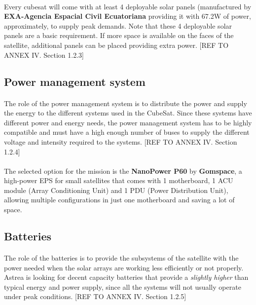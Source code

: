 \paragraph{}Every cubesat will come with at least 4 deployable solar panels (manufactured by \textbf{EXA-Agencia Espacial Civil Ecuatoriana} providing it with 67.2W of power, approximately, to supply peak demands. Note that these 4 deployable solar panels are a basic requirement. If more space is available on the faces of the satellite, additional panels can be placed providing extra power. [{REF TO ANNEX IV. Section 1.2.3}]

\subsection{Power management system}
\paragraph{}The role of the power management system is to distribute the power and supply the energy to the different systems used in the CubeSat. Since these systems have different power and energy needs, the power management system has to be highly compatible and must have a high enough number of buses to supply the different voltage and intensity required to the systems. [{REF TO ANNEX IV. Section 1.2.4}]

\paragraph{}The selected option for the mission is the \textbf{NanoPower P60} by \textbf{Gomspace}, a high-power EPS for small satellites that comes with 1 motherboard, 1 ACU module (Array Conditioning Unit) and 1 PDU (Power Distribution Unit), allowing multiple configurations in just one motherboard and saving a lot of space.


\subsection{Batteries}
\paragraph{}	The role of the batteries is to provide the subsystems of the satellite with the power needed when the solar arrays are working less efficiently or not properly. Astrea is looking for decent capacity batteries that provide a \textit{slightly higher} than typical energy and power supply, since all the systems will not usually operate under peak conditions. [{REF TO ANNEX IV. Section 1.2.5}]

